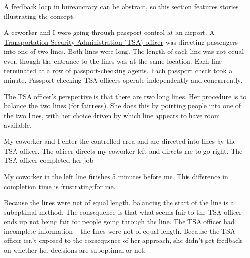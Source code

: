 A feedback loop in bureaucracy can be abstract, so this section features stories illustrating the concept.

\begin{mdframed}[frametitle={Airport Security Line},frametitlerule=true,frametitlealignment=\centering]
A coworker and I were going through passport control at an airport. 
A \href{https://en.wikipedia.org/wiki/Transportation_Security_Administration}{Transportation Security Administration (TSA) officer} 
was directing passengers into one of two lines. Both lines were long. The length of each line was not equal even though the entrance to the lines was at the same location. Each line terminated at a row of passport-checking agents. Each passport check took a minute. Passport-checking TSA officers operate independently and concurrently.


The TSA officer's perspective is that there are two long lines. Her procedure is to balance the two lines (for fairness). She does this by pointing people into one of the two lines, with her choice driven by which line appears to have room available.

My coworker and I enter the controlled area and are directed into lines by the TSA officer. The officer directs my coworker left and directs me to go right. The TSA officer completed her job.

My coworker in the left line finishes 5 minutes before me. This difference in completion time is frustrating for me.

Because the lines were not of equal length, balancing the start of the line is a suboptimal method. The consequence is that what seems fair to the TSA officer ends up not being fair for people going through the line. The TSA officer had incomplete information -- the lines were not of equal length. Because the TSA officer isn't exposed to the consequence of her approach, she didn't get feedback on whether her decisions are suboptimal or not.
\end{mdframed}

